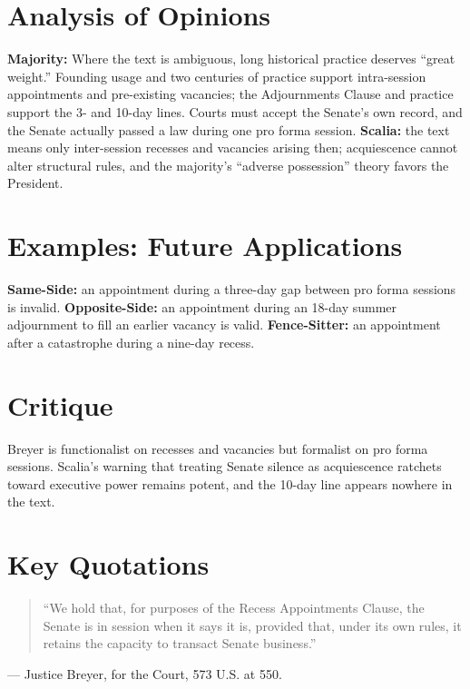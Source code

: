 \documentclass[12pt]{article}
\begin{document}
\section{Analysis of Opinions}
\textbf{Majority:} Where the text is ambiguous, long historical practice deserves ``great weight.'' Founding usage and two centuries of practice support intra-session appointments and pre-existing vacancies; the Adjournments Clause and practice support the 3- and 10-day lines. Courts must accept the Senate's own record, and the Senate actually passed a law during one pro forma session. \textbf{Scalia:} the text means only inter-session recesses and vacancies arising then; acquiescence cannot alter structural rules, and the majority's ``adverse possession'' theory favors the President.

\section{Examples: Future Applications}
\textbf{Same-Side:} an appointment during a three-day gap between pro forma sessions is invalid. \textbf{Opposite-Side:} an appointment during an 18-day summer adjournment to fill an earlier vacancy is valid. \textbf{Fence-Sitter:} an appointment after a catastrophe during a nine-day recess.

\section{Critique}
Breyer is functionalist on recesses and vacancies but formalist on pro forma sessions. Scalia's warning that treating Senate silence as acquiescence ratchets toward executive power remains potent, and the 10-day line appears nowhere in the text.

\section{Key Quotations}
\begin{quote}
``We hold that, for purposes of the Recess Appointments Clause, the Senate is in session when it says it is, provided that, under its own rules, it retains the capacity to transact Senate business.''
\end{quote}
\noindent --- Justice Breyer, for the Court, 573 U.S. at 550.
\end{document}
